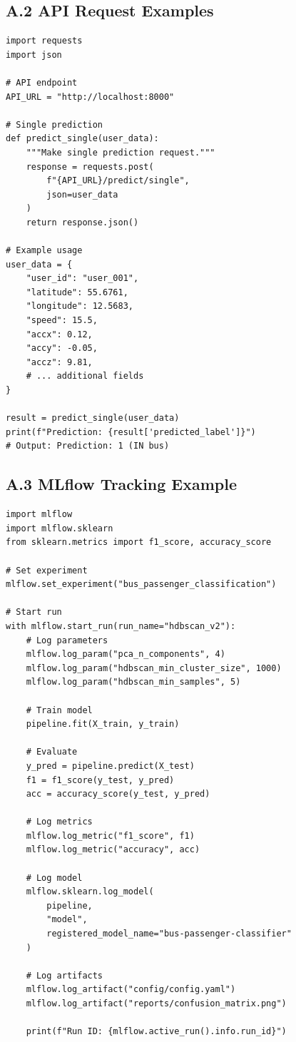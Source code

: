 \subsection*{A.2 API Request Examples}

\begin{lstlisting}[style=python, caption=Python API Client]
import requests
import json

# API endpoint
API_URL = "http://localhost:8000"

# Single prediction
def predict_single(user_data):
    """Make single prediction request."""
    response = requests.post(
        f"{API_URL}/predict/single",
        json=user_data
    )
    return response.json()

# Example usage
user_data = {
    "user_id": "user_001",
    "latitude": 55.6761,
    "longitude": 12.5683,
    "speed": 15.5,
    "accx": 0.12,
    "accy": -0.05,
    "accz": 9.81,
    # ... additional fields
}

result = predict_single(user_data)
print(f"Prediction: {result['predicted_label']}")
# Output: Prediction: 1 (IN bus)
\end{lstlisting}

\subsection*{A.3 MLflow Tracking Example}

\begin{lstlisting}[style=python, caption=MLflow Experiment Tracking]
import mlflow
import mlflow.sklearn
from sklearn.metrics import f1_score, accuracy_score

# Set experiment
mlflow.set_experiment("bus_passenger_classification")

# Start run
with mlflow.start_run(run_name="hdbscan_v2"):
    # Log parameters
    mlflow.log_param("pca_n_components", 4)
    mlflow.log_param("hdbscan_min_cluster_size", 1000)
    mlflow.log_param("hdbscan_min_samples", 5)
    
    # Train model
    pipeline.fit(X_train, y_train)
    
    # Evaluate
    y_pred = pipeline.predict(X_test)
    f1 = f1_score(y_test, y_pred)
    acc = accuracy_score(y_test, y_pred)
    
    # Log metrics
    mlflow.log_metric("f1_score", f1)
    mlflow.log_metric("accuracy", acc)
    
    # Log model
    mlflow.sklearn.log_model(
        pipeline, 
        "model",
        registered_model_name="bus-passenger-classifier"
    )
    
    # Log artifacts
    mlflow.log_artifact("config/config.yaml")
    mlflow.log_artifact("reports/confusion_matrix.png")
    
    print(f"Run ID: {mlflow.active_run().info.run_id}")
\end{lstlisting}

